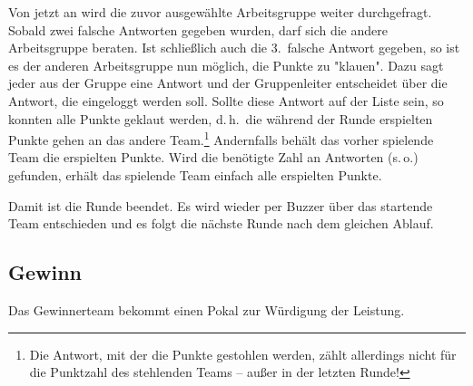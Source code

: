 \documentclass[a4paper, 12pt, headlines=2.1, headsepline, ngerman]{scrartcl}
\begin{document}
Von jetzt an wird die zuvor ausgewählte Arbeitsgruppe weiter durchgefragt.
Sobald zwei falsche Antworten gegeben wurden, darf sich die andere Arbeitsgruppe beraten.
Ist schließlich auch die 3.~falsche Antwort gegeben, so ist es der anderen Arbeitsgruppe nun möglich, die Punkte zu "klauen".
Dazu sagt jeder aus der Gruppe eine Antwort und der Gruppenleiter entscheidet über die Antwort, die eingeloggt werden soll.
Sollte diese Antwort auf der Liste sein, so konnten alle Punkte geklaut werden, d.\,h.\ die während der Runde erspielten Punkte gehen an das andere Team.\footnote{Die Antwort, mit der die Punkte gestohlen werden, zählt allerdings nicht für die Punktzahl des stehlenden Teams – außer in der letzten Runde!}
Andernfalls behält das vorher spielende Team die erspielten Punkte.
Wird die benötigte Zahl an Antworten (s.\,o.) gefunden, erhält das spielende Team einfach alle erspielten Punkte.

Damit ist die Runde beendet. Es wird wieder per Buzzer über das startende Team entschieden und es folgt die nächste Runde nach dem gleichen Ablauf.

\subsection*{Gewinn}
Das Gewinnerteam bekommt einen Pokal zur Würdigung der Leistung.
\end{document}
